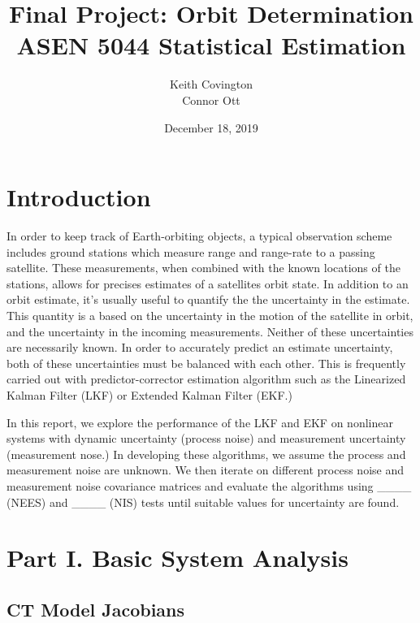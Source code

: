 \documentclass[11pt, a4paper]{article}
\begin{document}
\title{Final Project: Orbit Determination\\ ASEN 5044 Statistical Estimation}
\author{Keith Covington\\Connor Ott}
\date{December 18, 2019}
\maketitle



\section*{Introduction}
In order to keep track of Earth-orbiting objects, a typical observation scheme includes ground stations which measure range and range-rate to a passing satellite. 
These measurements, when combined with the known locations of the stations, allows for precises estimates of a satellites orbit state. 
In addition to an orbit estimate, it's usually useful to quantify the the uncertainty in the estimate. 
This quantity is a based on the uncertainty in the motion of the satellite in orbit, and the uncertainty in the incoming measurements. 
Neither of these uncertainties are necessarily known.
In order to accurately predict an estimate uncertainty, both of these uncertainties must be balanced with each other. 
This is frequently carried out with predictor-corrector estimation algorithm such as the Linearized Kalman Filter (LKF) or Extended Kalman Filter (EKF.)

In this report, we explore the performance of the LKF and EKF on nonlinear systems with dynamic uncertainty (process noise) and measurement uncertainty (measurement nose.) 
In developing these algorithms, we assume the process and measurement noise are unknown.
We then iterate on different process noise and measurement noise covariance matrices and evaluate the algorithms using \_\_\_\_ (NEES) and \_\_\_\_ (NIS) tests until suitable values for uncertainty are found. 

\section{Part I. Basic System Analysis}
\label{sec: Part I}

\subsection{CT Model Jacobians}
\end{document}
